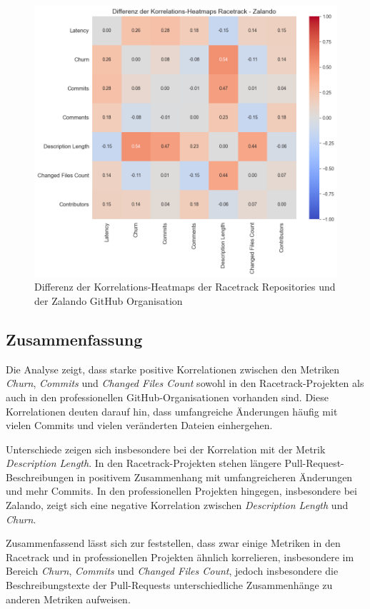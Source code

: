 \begin{figure}[htbp]
\includegraphics[width=\textwidth]{Figures/diff-korrelationsmatrix-racetrack-zalando.png}
\caption{Differenz der Korrelations-Heatmaps der Racetrack Repositories und der Zalando GitHub Organisation}
\label{fig:diff-korrelationsmatrix-racetrack-zalando}
\end{figure}

\newpage

\subsection{Zusammenfassung}
Die Analyse zeigt, dass starke positive Korrelationen zwischen den Metriken \textit{Churn}, \textit{Commits} und \textit{Changed Files Count} sowohl in den Racetrack-Projekten als auch in den professionellen GitHub-Organisationen vorhanden sind. Diese Korrelationen deuten darauf hin, dass umfangreiche Änderungen häufig mit vielen Commits und vielen veränderten Dateien einhergehen.

Unterschiede zeigen sich insbesondere bei der Korrelation mit der Metrik \textit{Description Length}. In den Racetrack-Projekten stehen längere Pull-Request-Beschreibungen in positivem Zusammenhang mit umfangreicheren Änderungen und mehr Commits. 
In den professionellen Projekten hingegen, insbesondere bei Zalando, zeigt sich eine negative Korrelation zwischen \textit{Description Length} und \textit{Churn}. 

Zusammenfassend lässt sich zur  feststellen, dass zwar einige Metriken in den Racetrack und in professionellen Projekten ähnlich korrelieren, insbesondere im Bereich \textit{Churn}, \textit{Commits} und \textit{Changed Files Count}, jedoch insbesondere die Beschreibungstexte der Pull-Requests unterschiedliche Zusammenhänge zu anderen Metriken aufweisen.

\newpage




